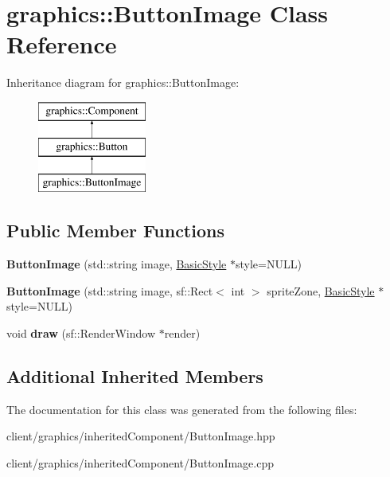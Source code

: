 \hypertarget{classgraphics_1_1_button_image}{\section{graphics\-:\-:Button\-Image Class Reference}
\label{classgraphics_1_1_button_image}
}
Inheritance diagram for graphics\-:\-:Button\-Image\-:\begin{figure}[H]
\begin{center}
\leavevmode
\includegraphics[height=3.000000cm]{classgraphics_1_1_button_image}
\end{center}
\end{figure}
\subsection*{Public Member Functions}
\begin{DoxyCompactItemize}
\item 
\hypertarget{classgraphics_1_1_button_image_a4e1587f50cc9258cc4319e011c5eb373}{{\bfseries Button\-Image} (std\-::string image, \hyperlink{classgraphics_1_1_basic_style}{Basic\-Style} $\ast$style=N\-U\-L\-L)}\label{classgraphics_1_1_button_image_a4e1587f50cc9258cc4319e011c5eb373}

\item 
\hypertarget{classgraphics_1_1_button_image_a0b289cf2ef145365e8958bc6cbc12d0b}{{\bfseries Button\-Image} (std\-::string image, sf\-::\-Rect$<$ int $>$ sprite\-Zone, \hyperlink{classgraphics_1_1_basic_style}{Basic\-Style} $\ast$style=N\-U\-L\-L)}\label{classgraphics_1_1_button_image_a0b289cf2ef145365e8958bc6cbc12d0b}

\item 
\hypertarget{classgraphics_1_1_button_image_ad8f23d98da318754cff31e16fe6391ef}{void {\bfseries draw} (sf\-::\-Render\-Window $\ast$render)}\label{classgraphics_1_1_button_image_ad8f23d98da318754cff31e16fe6391ef}

\end{DoxyCompactItemize}
\subsection*{Additional Inherited Members}


The documentation for this class was generated from the following files\-:\begin{DoxyCompactItemize}
\item 
client/graphics/inherited\-Component/Button\-Image.\-hpp\item 
client/graphics/inherited\-Component/Button\-Image.\-cpp\end{DoxyCompactItemize}
